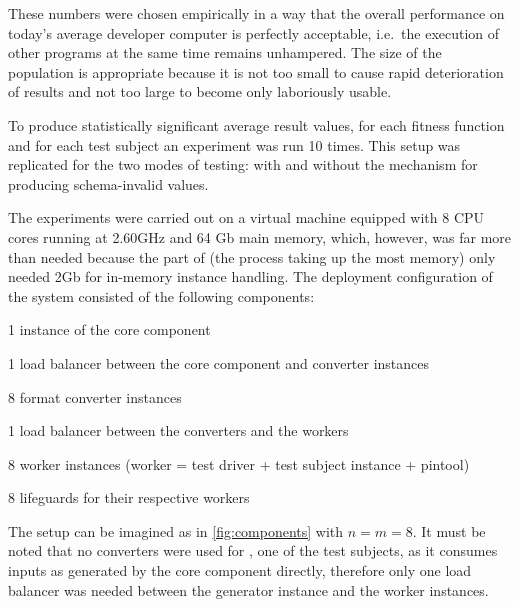 These numbers were chosen empirically in a way that the overall performance on today's average developer
computer is perfectly acceptable, i.e.\ the execution of other programs at the same time remains unhampered.
The size of the population is appropriate because it is not too small to cause rapid deterioration of results
and not too large to become only laboriously usable.

To produce statistically significant average result values, for each fitness function and for each test
subject an experiment was run 10 times. This setup was replicated for the two modes of testing: with and
without the mechanism for producing schema-invalid values.

The experiments were carried out on a virtual machine equipped with 8 CPU cores running at 2.60GHz and 64 Gb
main memory, which, however, was far more than needed because the \java part of \xmlmate{} (the process taking
up the most memory) only needed 2Gb for in-memory \xml instance handling. The deployment configuration
of the \xmlmate system consisted of the following components:

\begin{itemize*}
  \item 1 instance of the \java \xmlmate core component
  \item 1 load balancer between the core component and converter instances
  \item 8 format converter instances
  \item 1 load balancer between the converters and the workers
  \item 8 worker instances (worker = test driver + test subject instance + pintool)
  \item 8 lifeguards for their respective workers
\end{itemize*}

The setup can be imagined as in \cref{fig:components} with $n = m = 8$.
It must be noted that no converters were used for \libxml, one of the test subjects, as it consumes
inputs as generated by the \xmlmate core component directly, therefore only one load balancer was needed between the generator
instance and the worker instances.

